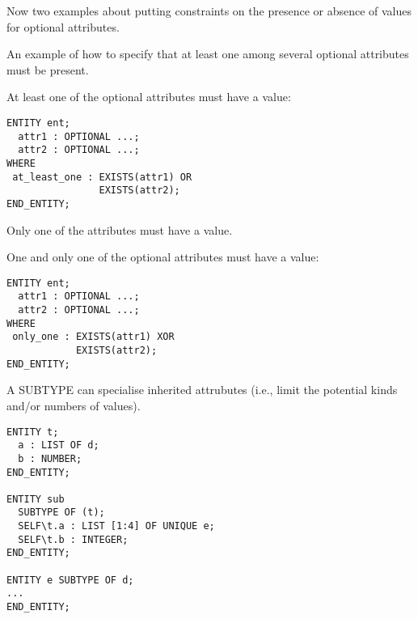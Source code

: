\begin{remarks}
\remintro
{}

    Now two examples about putting constraints on the presence
or absence of values for optional attributes.

    An example of how to specify that at least one among several optional
attributes must be present.

\remend
\end{remarks}


  At least one of the optional attributes must have a value:

\begin{verbatim}
ENTITY ent;
  attr1 : OPTIONAL ...;
  attr2 : OPTIONAL ...;
WHERE
 at_least_one : EXISTS(attr1) OR
                EXISTS(attr2);
END_ENTITY;
\end{verbatim}


\begin{remarks}
\remintro
{}

    Only one of the attributes must have a value.

\remend
\end{remarks}

\clearpage

  One and only one of the optional attributes must have a value:

\begin{verbatim}
ENTITY ent;
  attr1 : OPTIONAL ...;
  attr2 : OPTIONAL ...;
WHERE
 only_one : EXISTS(attr1) XOR
            EXISTS(attr2);
END_ENTITY;
\end{verbatim}


\begin{remarks}
\remintro
{}

    A SUBTYPE can specialise inherited attrubutes (i.e., limit
the potential kinds and/or numbers of values).

\remend
\end{remarks}


\begin{verbatim}
ENTITY t;
  a : LIST OF d;
  b : NUMBER;
END_ENTITY;

ENTITY sub
  SUBTYPE OF (t);
  SELF\t.a : LIST [1:4] OF UNIQUE e;
  SELF\t.b : INTEGER;
END_ENTITY;

ENTITY e SUBTYPE OF d;
...
END_ENTITY;
\end{verbatim}



